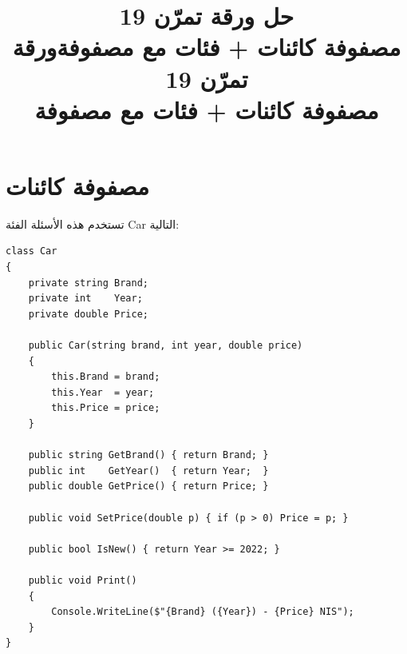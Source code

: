 \documentclass[14pt]{extarticle}
\title{حل ورقة تمرّن 19 \\ مصفوفة كائنات + فئات مع مصفوفة}
\title{ورقة تمرّن 19 \\ مصفوفة كائنات + فئات مع مصفوفة}
\begin{document}
\maketitle
\thispagestyle{fancy}

\section{مصفوفة كائنات}

تستخدم هذه الأسئلة الفئة \textenglish{Car} التالية:

\begin{boxExample}
\begin{english}
{\small
\begin{verbatim}
class Car
{
    private string Brand;
    private int    Year;
    private double Price;

    public Car(string brand, int year, double price)
    {
        this.Brand = brand;
        this.Year  = year;
        this.Price = price;
    }

    public string GetBrand() { return Brand; }
    public int    GetYear()  { return Year;  }
    public double GetPrice() { return Price; }

    public void SetPrice(double p) { if (p > 0) Price = p; }

    public bool IsNew() { return Year >= 2022; }

    public void Print()
    {
        Console.WriteLine($"{Brand} ({Year}) - {Price} NIS");
    }
}
\end{verbatim}
}
\end{english}
\end{boxExample}
\end{document}
